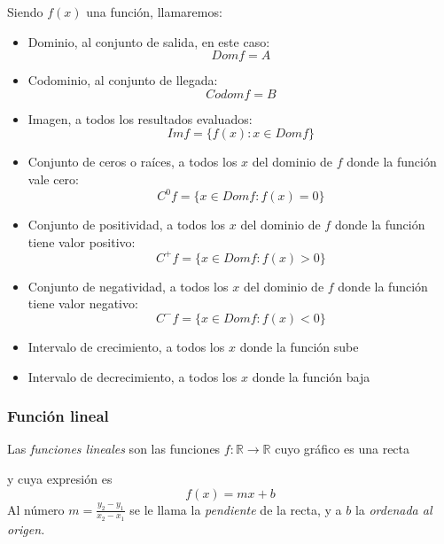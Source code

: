 \documentclass[Análisis.root.tex]{subfiles}
\newcommand{\R}{\mathbb{R}}
\begin{document}
        Siendo \(f(x)\) una función, llamaremos:
        \begin{itemize}
            \item Dominio, al conjunto de salida, en este caso: \[Dom f=A\]
            \item Codominio, al conjunto de llegada: \[Codom f=B\]
            \item Imagen, a todos los resultados evaluados: \[Im f=\{f(x):x \in Dom f\}\]
            \item Conjunto de ceros o raíces, a todos los \(x\) del dominio de \(f\) donde la función vale cero: \[C^0 f=\{x\in Dom f:f(x)=0\}\]
            \item Conjunto de positividad, a todos los \(x\) del dominio de \(f\) donde la función tiene valor positivo: \[C^+ f=\{x\in Dom f:f(x) > 0\}\]
            \item Conjunto de negatividad, a todos los \(x\) del dominio de \(f\) donde la función tiene valor negativo: \[C^- f=\{x\in Dom f:f(x) < 0\}\]
            \item Intervalo de crecimiento, a todos los \(x\) donde la función sube
            \item Intervalo de decrecimiento, a todos los \(x\) donde la función baja
        \end{itemize}
        \subsubsection{Función lineal}
        Las \textit{funciones lineales} son las funciones \(f: \R \rightarrow \R\) cuyo gráfico es una recta
        \begin{center}
        \end{center}
        y cuya expresión es \[f(x)=mx+b\] Al número \(m = \frac{y_2-y_1}{x_2-x_1}\) se le llama la \textit{pendiente} de la recta, y a \(b\) la \textit{ordenada al origen.}
\end{document}
